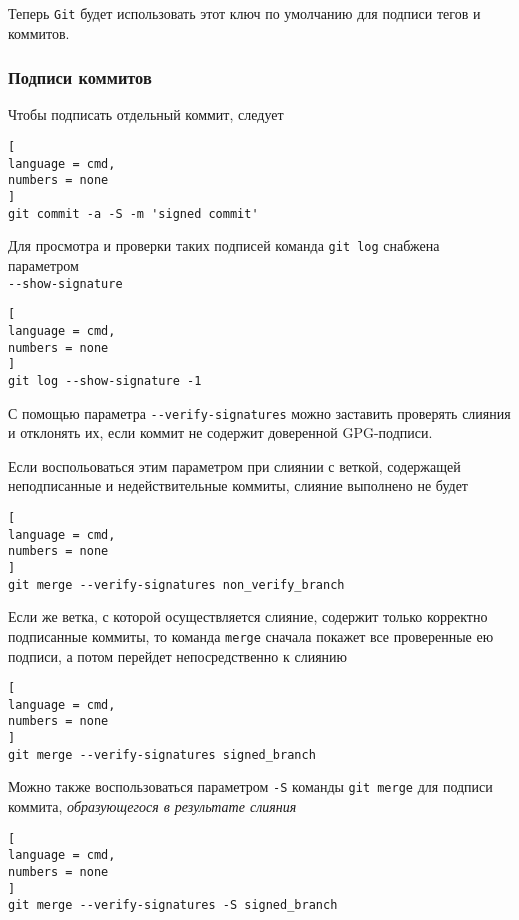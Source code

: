 \documentclass[%
	11pt,
	a4paper,
	utf8,
		]{article}
\begin{document}
Теперь \texttt{Git} будет использовать этот ключ по умолчанию для подписи тегов и коммитов.

\subsubsection{Подписи коммитов}

Чтобы подписать отдельный коммит, следует

\begin{lstlisting}[
language = cmd,
numbers = none
]
git commit -a -S -m 'signed commit'
\end{lstlisting}

Для просмотра и проверки таких подписей команда \texttt{git log} снабжена параметром \\\mbox{\lstinline{--show-signature}}

\begin{lstlisting}[
language = cmd,
numbers = none
]
git log --show-signature -1
\end{lstlisting}

С помощью параметра \lstinline{--verify-signatures} можно заставить проверять слияния и отклонять их, если коммит не содержит доверенной GPG-подписи.

Если воспольоваться этим параметром при слиянии с веткой, содержащей неподписанные и недействительные коммиты, слияние выполнено не будет

\begin{lstlisting}[
language = cmd,
numbers = none
]
git merge --verify-signatures non_verify_branch
\end{lstlisting}

Если же ветка, с которой осуществляется слияние, содержит только корректно подписанные коммиты, то команда \texttt{merge} сначала покажет все проверенные ею подписи, а потом перейдет непосредственно к слиянию

\begin{lstlisting}[
language = cmd,
numbers = none
]
git merge --verify-signatures signed_branch
\end{lstlisting}

Можно также воспользоваться параметром \texttt{-S} команды \texttt{git merge} для подписи коммита, \emph{образующегося в результате слияния}

\begin{lstlisting}[
language = cmd,
numbers = none
]
git merge --verify-signatures -S signed_branch
\end{lstlisting}
\end{document}
